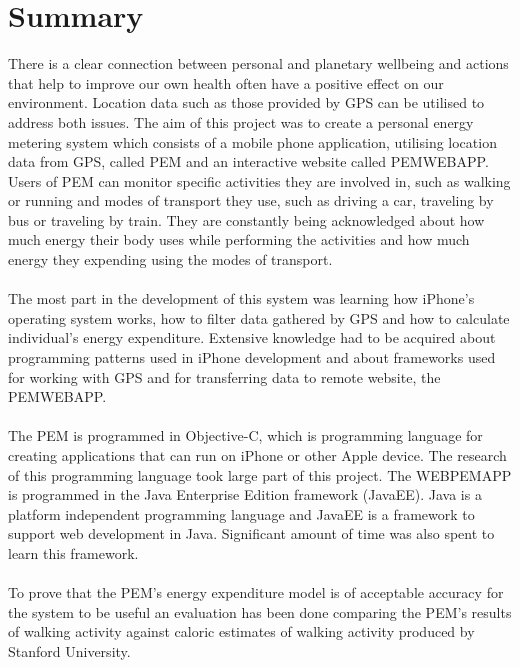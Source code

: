 \documentclass[12pt, a4paper]{report}   %
\begin{document}
\clearpage
\section*{Summary}
There is a clear connection between personal and planetary wellbeing and actions that help to improve our own health often have a positive effect on our environment. Location data such as those provided by GPS can be utilised to address both issues. The aim of this project was to create a personal energy metering system which consists of a mobile phone application, utilising location data from GPS, called PEM and an interactive website called PEMWEBAPP. Users of PEM can monitor specific activities they are involved in, such as walking or running and modes of transport they use, such as driving a car, traveling by bus or traveling by train. They are constantly being acknowledged about how much energy their body uses while performing the activities and how much energy they expending using the modes of transport.\\ \\
The most part in the development of this system was learning how iPhone's operating system works, how to filter data gathered by GPS and how to calculate individual's energy expenditure. Extensive knowledge had to be acquired about programming patterns used in iPhone development and about frameworks used for working with GPS and for transferring data to remote website, the PEMWEBAPP.\\ \\
The PEM is programmed in Objective-C, which is programming language for creating applications that can run on iPhone or other Apple device. The research of this programming language took large part of this project.
The WEBPEMAPP is programmed in the Java Enterprise Edition framework (JavaEE). Java is a platform independent programming language and JavaEE is a framework to support web development in Java. Significant amount of time was also spent to learn this framework.\\ \\
To prove that the PEM's energy expenditure model is of acceptable accuracy for the system to be useful an evaluation has been done comparing the PEM's results of walking activity against caloric estimates of walking activity produced by Stanford University.


\tableofcontents
\thispagestyle{empty}


\clearpage
{}
\end{document}
